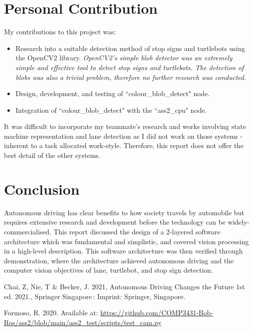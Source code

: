 \documentclass[11pt]{article}
\begin{document}
\section{Personal Contribution}
\label{sec:contribution}

    My contributions to this project was:
    \begin{itemize}
        \item Research into a suitable detection method of stop signs and turtlebots using the OpenCV2 library.
        \subitem \textit{OpenCV2's simple blob detector was an extremely simple and effective tool to detect stop signs and turtlebots. The detection of blobs was also a trivial problem, therefore no further research was conducted.}
        \item Design, development, and testing of ``colour\_blob\_detect" node.
        \item Integration of ``colour\_blob\_detect" with the ``ass2\_cpu" node.
    \end{itemize}

    It was difficult to incorporate my teammate's research and works involving state machine representation and lane detection as I did not work on those systems - inherent to a task allocated work-style. Therefore, this report does not offer the best detail of the other systems.

\section{Conclusion}
\label{sec:conclusion}

    Autonomous driving has clear benefits to how society travels by automobile but requires extensive research and development before the technology can be widely-commercialised. This report discussed the design of a 2-layered software architecture which was fundamental and simplistic, and covered vision processing in a high-level description. This software architecture was then verified through demonstration, where the architecture achieved autonomous driving and the computer vision objectives of lane, turtlebot, and stop sign detection.

\pagebreak


\begin{thebibliography}{3}

     Chai, Z, Nie, T \& Becker, J. 2021, Autonomous Driving Changes the Future 1st ed. 2021., Springer Singapore : Imprint: Springer, Singapore.

     Formoso, R. 2020. Available at: \url{https://github.com/COMP3431-Bob-Ros/ass2/blob/main/ass2_test/scripts/test_cam.py}

\end{thebibliography}
\end{document}
